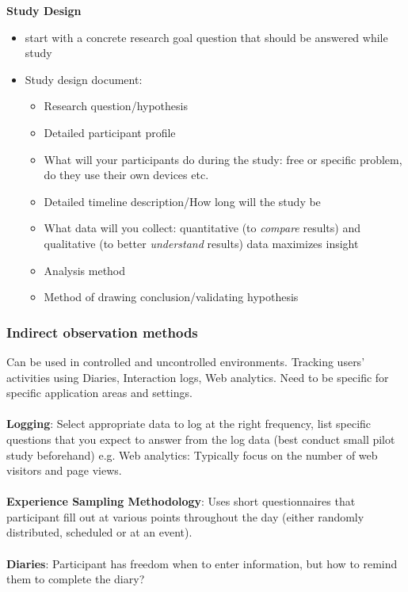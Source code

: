 \textbf{Study Design}
\begin{itemize}
\item start with a concrete research goal question that should be answered while study
\item Study design document:
\begin{itemize}
\item Research question/hypothesis
\item Detailed participant profile
\item What will your participants do during the study: free or specific problem, do they use their own devices etc.
\item Detailed timeline description/How long will the study be
\item What data will you collect: quantitative (to \textit{compare} results) and qualitative (to better \textit{understand} results) data maximizes insight
\item Analysis method
\item Method of drawing conclusion/validating hypothesis
\end{itemize}
\end{itemize}
\subsubsection{Indirect observation methods}
Can be used in controlled and uncontrolled environments. Tracking users' activities using Diaries, Interaction logs, Web analytics. Need to be specific for specific application areas and settings.\\\\
\textbf{Logging}: Select appropriate data to log at the right frequency, list specific questions that you expect to answer from the log data (best conduct small pilot study beforehand)
e.g. Web analytics: Typically focus on the number of web visitors and page views.\\\\
\textbf{Experience Sampling Methodology}: Uses short questionnaires  that participant fill out at various points throughout the day (either randomly distributed, scheduled or at an event).\\\\
\textbf{Diaries}: Participant has freedom when to enter information, but how to remind them to complete the diary?  


